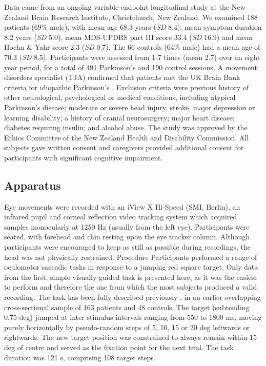 \documentclass[jou,a4paper]{apa6}
\begin{document}
Data came from an ongoing variable-endpoint longitudinal study at the New Zealand Brain Research Institute, Christchurch, New Zealand. We examined 188 patients (69\% male), with mean age 68.3 years (\textit{SD} 8.4), mean symptom duration 8.2 years (\textit{SD} 5.0), mean MDS-UPDRS part III score 33.4 (\textit{SD} 16.9) and mean Hoehn \& Yahr score 2.3 (\textit{SD} 0.7). The 66 controls (64\% male) had a mean age of 70.3 (\textit{SD} 8.5). Participants were assessed from 1-7 times (mean 2.7) over an eight year period, for a total of 491 Parkinson's and 190 control sessions. A movement disorders specialist (TJA) confirmed that patients met the UK Brain Bank criteria for idiopathic Parkinson's \citep{Hughes1992Accuracy-of-cli}. Exclusion criteria were previous history of other neurological, psychological or medical conditions, including atypical Parkinson's disease; moderate or severe head injury, stroke, major depression or learning disability; a history of cranial neurosurgery; major heart disease; diabetes requiring insulin; and alcohol abuse. The study was approved by the Ethics Committee of the New Zealand Health and Disability Commission. All subjects gave written consent and caregivers provided additional consent for participants with significant cognitive impairment.

\subsection{Apparatus}
Eye movements were recorded with an iView X Hi-Speed (SMI, Berlin), an infrared pupil and corneal reflection video tracking system which acquired samples monocularly at 1250 Hz (usually from the left eye). Participants were seated, with forehead and chin resting upon the eye tracker column. Although participants were encouraged to keep as still as possible during recordings, the head was not physically restrained.
Procedure
Participants performed a range of oculomotor saccadic tasks in response to a jumping red square target. Only data from the first, simple visually-guided task is presented here, as it was the easiest to perform and therefore the one from which the most subjects produced a valid recording. The task has been fully described previously \citep{MacAskill2012The-influence-o}, in an earlier overlapping cross-sectional sample of 163 patients and 48 controls.
The target (subtending 0.75 deg) jumped at inter-stimulus intervals ranging from 550 to 1800 ms, moving purely horizontally by pseudo-random steps of 5, 10, 15 or 20 deg leftwards or rightwards. The new target position was constrained to always remain within 15 deg of centre and served as the fixation point for the next trial. The task duration was 121 s, comprising 108 target steps.
\end{document}
